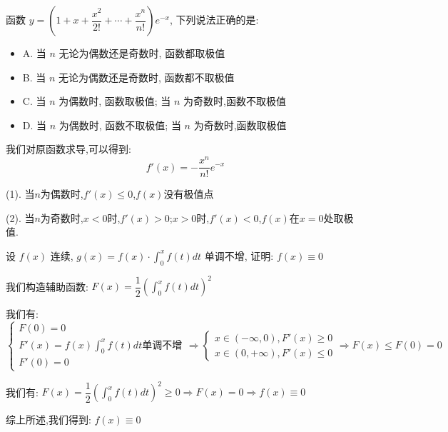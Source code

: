 \begin{example}[][Exam: 35.3.1]
	函数 $y=\left(1+x+\dfrac{x^2}{2!}+\cdots+\dfrac{x^n}{n!} \right)e^{-x}$, 下列说法正确的是:  
\begin{itemize}
	\item A. 当 $n$ 无论为偶数还是奇数时, 函数都取极值
	\item B. 当 $n$ 无论为偶数还是奇数时, 函数都不取极值
	\item C. 当 $n$ 为偶数时, 函数取极值; 当 $n$ 为奇数时,函数不取极值
	\item D. 当 $n$ 为偶数时, 函数不取极值; 当 $n$ 为奇数时,函数取极值
\end{itemize}
\end{example}

\begin{solution}

	我们对原函数求导,可以得到:  
	$$f'(x)=-\dfrac{x^{n}}{n!}e^{-x}$$
	
	(1). 当$n$为偶数时,$f'(x)\leq 0$,$f(x)$没有极值点
	
	(2). 当$n$为奇数时,$x<0$时,$f'(x)>0$;$x>0$时,$f'(x)<0$,$f(x)$在$x=0$处取极值.
\end{solution}

\begin{example}[][Exam: 35.3.2]
	设 $f(x)$ 连续, $g(x)=f(x)\cdot\int_{0}^{x}f(t)dt$ 单调不增, 证明: $f(x)\equiv 0$
\end{example}

\begin{solution}

	我们构造辅助函数:  $F(x)=\dfrac{1}{2}\left(\int_{0}^{x}f(t)dt \right)^2$
	
	我们有:  $$\left\lbrace
	\begin{array}{l}
		F(0)=0\\
		F'(x)=f(x)\int_{0}^{x}f(t)dt\text{单调不增}\\
		F'(0)=0
	\end{array}
	\right. \Rightarrow \left\lbrace
	\begin{array}{l}
		x\in(-\infty,0),F'(x)\geq 0\\
		x\in(0,+\infty),F'(x)\leq 0
	\end{array}
	\right. \Rightarrow F(x)\leq F(0)=0$$
	
	我们有:  $F(x)=\dfrac{1}{2}\left(\int_{0}^{x}f(t)dt \right)^2\geq 0\Rightarrow F(x)=0\Rightarrow f(x)\equiv 0$
	
	综上所述,我们得到:  $f(x)\equiv 0$
\end{solution}


